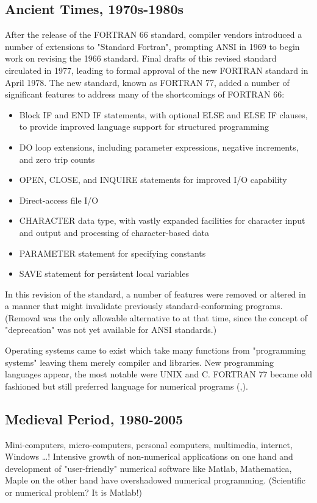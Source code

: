 \documentclass[a4paper]{article}
\begin{document}
\subsection{Ancient Times, 1970s-1980s}
After the release of the FORTRAN 66 standard, compiler vendors introduced a number of extensions to "Standard Fortran", prompting ANSI in 1969 to begin work on revising the 1966 standard. Final drafts of this revised standard circulated in 1977, leading to formal approval of the new FORTRAN standard in April 1978. The new standard, known as FORTRAN 77, added a number of significant features to address many of the shortcomings of FORTRAN 66:
\begin {itemize}
    \item Block IF and END IF statements, with optional ELSE and ELSE IF clauses, to provide improved language support for structured programming
    \item DO loop extensions, including parameter expressions, negative increments, and zero trip counts
    \item OPEN, CLOSE, and INQUIRE statements for improved I/O capability
    \item Direct-access file I/O
    \item CHARACTER data type, with vastly expanded facilities for character input and output and processing of character-based data
    \item PARAMETER statement for specifying constants
    \item SAVE statement for persistent local variables
\end {itemize}
    In this revision of the standard, a number of features were removed or altered in a manner that might invalidate previously standard-conforming programs. (Removal was the only allowable alternative to  at that time, since the concept of "deprecation" was not yet available for ANSI standards.) 

Operating systems came to exist which take many functions from "programming systems" leaving them merely compiler and libraries. New programming languages appear, the most notable were UNIX and C. FORTRAN 77 became old fashioned but still preferred language for numerical programs (\cite{class-fort},\cite{page}). 
\subsection{Medieval Period, 1980-2005}
    Mini-computers, micro-computers, personal computers, multimedia, internet, Windows \ldots !
    Intensive  growth of non-numerical applications on one hand and development of "user-friendly" numerical software like Matlab, Mathematica, Maple on the other hand  have overshadowed numerical programming. (Scientific or numerical problem? It is Matlab!)
\end{document}
